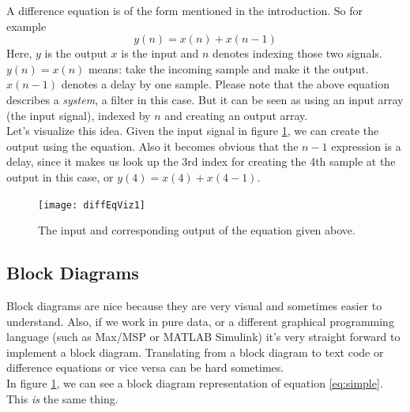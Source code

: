 A difference equation is of the form mentioned in the introduction. So for example
\begin{equation}
	y(n) = x(n)+x(n-1)
	\label{eq:simple}
\end{equation}
Here, $y$ is the output $x$ is the input and $n$ denotes indexing those two signals.\\
$y(n)=x(n)$ means: take the incoming sample and make it the output. $x(n-1)$ denotes a delay by one sample. Please note that the above equation describes a \textit{system}, a filter in this case. But it can be seen as using an input array (the input signal), indexed by $n$ and creating an output array.\\
Let's visualize this idea. Given the input signal in figure \ref{fig:diffImpResp}, we can create the output using the equation. Also it becomes obvious that the $n-1$ expression is a delay, since it makes us look up the 3rd index for creating the 4th sample at the output in this case, or $y(4) = x(4)+x(4-1)$.
\begin{figure}[h!]
	\centering
	\texttt{[image: diffEqViz1]}
	\caption[shortCaption]
	{The input and corresponding output of the equation given above.}
	\label{fig:diffImpResp}
\end{figure}


\subsection{Block Diagrams} %
\label{sub:block}

Block diagrams are nice because they are very visual and sometimes easier to understand. Also, if we work in pure data, or a different graphical programming language (such as Max/MSP or MATLAB Simulink) it's very straight forward to implement a block diagram. Translating from a block diagram to text code or difference equations or vice versa can be hard sometimes.\\
In figure \ref{fig:diffImpResp}, we can see a block diagram representation of equation \ref{eq:simple}. This \textit{is} the same thing.


